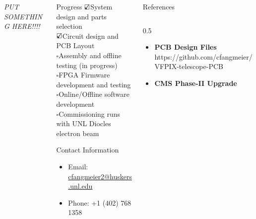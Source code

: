 \documentclass[final]{beamer}
\newlength{\onecolwide}
\newcommand{\checkedbox}{\textcolor{dgreen}{$\text{\rlap{$\checkmark$}}\square$}}
\newcommand{\checkbox}{$\square$}
\begin{document}
\begin{frame}[t]
\begin{columns}[t]
  \begin{column}{\onecolwide}
    \begin{center}
      \vspace{3in}
      \emph{PUT SOMETHING HERE!!!!}
    \end{center}
  \end{column}
  \begin{column}{\onecolwide}
    \begin{alertblock}{Progress}
      \checkedbox System design and parts selection \\
      \checkedbox Circuit design and PCB Layout \\
      \checkbox Assembly and offline testing (in progress)\\
      \checkbox FPGA Firmware development and testing \\
      \checkbox Online/Offline software development \\
      \checkbox Commissioning runs with UNL Diocles electron beam
    \end{alertblock}
    \begin{alertblock}{Contact Information}
      \begin{itemize}
      \item Email: \href{mailto:cfangmeier2@huskers.unl.edu}{cfangmeier2@huskers.unl.edu}
      \item Phone: +1 (402) 768 1358
      \end{itemize}
    \end{alertblock}
  \end{column}
  \begin{column}{\onecolwide}
    \begin{block}{References} 
      \tiny
      \begin{columns}[t]
        \begin{column}{0.5\onecolwide}
          \begin{itemize}
            \item \textbf{PCB Design Files} https://github.com/cfangmeier/VFPIX-telescope-PCB
            \item \textbf{CMS Phase-II Upgrade}

\end{itemize}
\end{column}
\end{columns}
\end{block}
\end{column}
\end{columns}
\end{frame}
\end{document}
